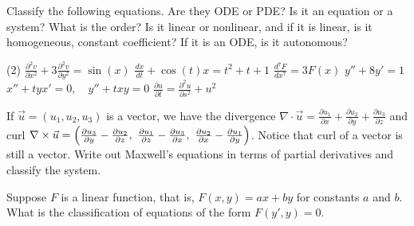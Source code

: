 \documentclass{ximera}
\begin{document}
\begin{exercise}%
    Classify the following equations.  Are they ODE or PDE\@?  Is it an equation or a system?  What is the order?  Is it linear or nonlinear, and if it is linear, is it homogeneous, constant coefficient?  If it is an ODE\@, is it autonomous?
    \begin{tasks}(2)
        \task $\displaystyle \frac{\partial^2 v}{\partial x^2} + 3 \frac{\partial^2 v}{\partial y^2} = \sin(x)$
        \task $\displaystyle \frac{d x}{dt} + \cos(t) x = t^2+t+1$
        \task $\displaystyle \frac{d^7 F}{dx^7} = 3F(x)$
        \task $\displaystyle y''+8y'=1$
        \task $\displaystyle x''+tyx'=0, \quad y''+txy = 0$
        \task $\displaystyle \frac{\partial u}{\partial t} = \frac{\partial^2 u}{\partial s^2} + u^2$
    \end{tasks}
\end{exercise}

\begin{exercise}
    If $\vec{u} = (u_1,u_2,u_3)$ is a vector, we have the divergence $\nabla \cdot \vec{u} = \frac{\partial u_1}{\partial x} + \frac{\partial u_2}{\partial y} + \frac{\partial u_3}{\partial z}$ and curl $\nabla \times \vec{u} = \Bigl( \frac{\partial u_3}{\partial y} - \frac{\partial u_2}{\partial z} , ~ \frac{\partial u_1}{\partial z} - \frac{\partial u_3}{\partial x} , ~ \frac{\partial u_2}{\partial x} - \frac{\partial u_1}{\partial y} \Bigr)$. Notice that curl of a vector is still a vector.  Write out Maxwell's equations in terms of partial derivatives and classify the system.
\end{exercise}

\begin{exercise}
    Suppose $F$ is a linear function, that is, $F(x,y) = ax+by$ for constants $a$ and $b$.  What is the classification of equations of the form $F(y',y) = 0$.
\end{exercise}
\end{document}
